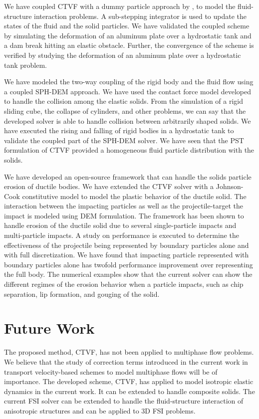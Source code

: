 We have coupled CTVF with a dummy particle approach by \cite{Adami2012}, to
model the fluid-structure interaction problems. A sub-stepping integrator is
used to update the states of the fluid and the solid particles. We have
validated the coupled scheme by simulating the deformation of an aluminum plate
over a hydrostatic tank and a dam break hitting an elastic obstacle. Further,
the convergence of the scheme is verified by studying the deformation of an
aluminum plate over a hydrostatic tank problem.

We have modeled the two-way coupling of the rigid body and the fluid flow using
a coupled SPH-DEM approach. We have used the contact force model developed to
handle the collision among the elastic solids. From the simulation of a rigid
sliding cube, the collapse of cylinders, and other problems, we can say that the
developed solver is able to handle collision between arbitrarily shaped solids.
We have executed the rising and falling of rigid bodies in a hydrostatic tank to
validate the coupled part of the SPH-DEM solver. We have seen that the PST
formulation of CTVF provided a homogeneous fluid particle distribution with the
solids.


We have developed an open-source framework that can handle the solids particle
erosion of ductile bodies. We have extended the CTVF solver with a Johnson-Cook
constitutive model to model the plastic behavior of the ductile solid. The
interaction between the impacting particles as well as the projectile-target the
impact is modeled using DEM formulation. The framework has been shown to handle
erosion of the ductile solid due to several single-particle impacts and
multi-particle impacts. A study on performance is executed to determine the
effectiveness of the projectile being represented by boundary particles alone
and with full discretization. We have found that impacting particle represented
with boundary particles alone has twofold performance improvement over
representing the full body. The numerical examples show that the current solver
can show the different regimes of the erosion behavior when a particle impacts,
such as chip separation, lip formation, and gouging of the solid.



\section{Future Work}\label{conclusions:future_work}
The proposed method, CTVF, has not been applied to multiphase flow problems. We
believe that the study of correction terms introduced in the current work in
transport velocity-based schemes to model multiphase flows will be of
importance. The developed scheme, CTVF, has applied to model isotropic elastic
dynamics in the current work. It can be extended to handle composite
solids. The current FSI solver can be extended to handle the fluid-structure
interaction of anisotropic structures and can be applied to 3D FSI problems.


